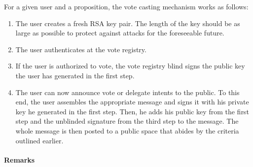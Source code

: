 For a given user and a proposition, the vote casting mechanism works as follows:
\begin{enumerate}
\item The user creates a fresh RSA key pair.
The length of the key should be as large as possible to protect against attacks for the foreseeable future.
\item The user authenticates at the vote registry.
\item If the user is authorized to vote, the vote registry blind signs the public key the user has generated in the first step.
\item The user can now announce vote or delegate intents to the public.
To this end, the user assembles the appropriate message and signs it with his private key he generated in the first step.
Then, he adds his public key from the first step and the unblinded signature from the third step to the message.
The whole message is then posted to a public space that abides by the criteria outlined earlier.
\end{enumerate}

\paragraph*{Remarks}


